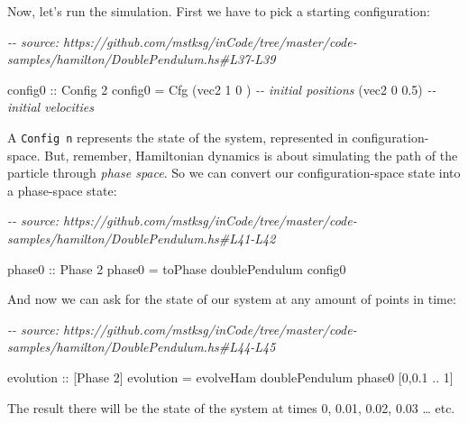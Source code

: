 \documentclass[]{article}
\newenvironment{Shaded}{}{}
\newcommand{\CommentTok}[1]{\textcolor[rgb]{0.38,0.63,0.69}{\textit{#1}}}
\newcommand{\DataTypeTok}[1]{\textcolor[rgb]{0.56,0.13,0.00}{#1}}
\newcommand{\DecValTok}[1]{\textcolor[rgb]{0.25,0.63,0.44}{#1}}
\newcommand{\FloatTok}[1]{\textcolor[rgb]{0.25,0.63,0.44}{#1}}
\newcommand{\NormalTok}[1]{#1}
\newcommand{\OperatorTok}[1]{\textcolor[rgb]{0.40,0.40,0.40}{#1}}
\newcommand{\OtherTok}[1]{\textcolor[rgb]{0.00,0.44,0.13}{#1}}
\begin{document}
Now, let's run the simulation. First we have to pick a starting configuration:

\begin{Shaded}
\begin{Highlighting}[]
\CommentTok{{-}{-} source: https://github.com/mstksg/inCode/tree/master/code{-}samples/hamilton/DoublePendulum.hs\#L37{-}L39}

\OtherTok{config0 ::} \DataTypeTok{Config} \DecValTok{2}
\NormalTok{config0 }\OtherTok{=} \DataTypeTok{Cfg}\NormalTok{ (vec2 }\DecValTok{1} \DecValTok{0}\NormalTok{  )  }\CommentTok{{-}{-} initial positions}
\NormalTok{              (vec2 }\DecValTok{0} \FloatTok{0.5}\NormalTok{)  }\CommentTok{{-}{-} initial velocities}
\end{Highlighting}
\end{Shaded}

A \texttt{Config\ n} represents the state of the system, represented in
configuration-space. But, remember, Hamiltonian dynamics is about simulating the
path of the particle through \emph{phase space}. So we can convert our
configuration-space state into a phase-space state:

\begin{Shaded}
\begin{Highlighting}[]
\CommentTok{{-}{-} source: https://github.com/mstksg/inCode/tree/master/code{-}samples/hamilton/DoublePendulum.hs\#L41{-}L42}

\OtherTok{phase0 ::} \DataTypeTok{Phase} \DecValTok{2}
\NormalTok{phase0 }\OtherTok{=}\NormalTok{ toPhase doublePendulum config0}
\end{Highlighting}
\end{Shaded}

And now we can ask for the state of our system at any amount of points in time:

\begin{Shaded}
\begin{Highlighting}[]
\CommentTok{{-}{-} source: https://github.com/mstksg/inCode/tree/master/code{-}samples/hamilton/DoublePendulum.hs\#L44{-}L45}

\OtherTok{evolution ::}\NormalTok{ [}\DataTypeTok{Phase} \DecValTok{2}\NormalTok{]}
\NormalTok{evolution }\OtherTok{=}\NormalTok{ evolveHam\textquotesingle{} doublePendulum phase0 [}\DecValTok{0}\NormalTok{,}\FloatTok{0.1} \OperatorTok{..} \DecValTok{1}\NormalTok{]}
\end{Highlighting}
\end{Shaded}

The result there will be the state of the system at times 0, 0.01, 0.02, 0.03
\ldots{} etc.
\end{document}
